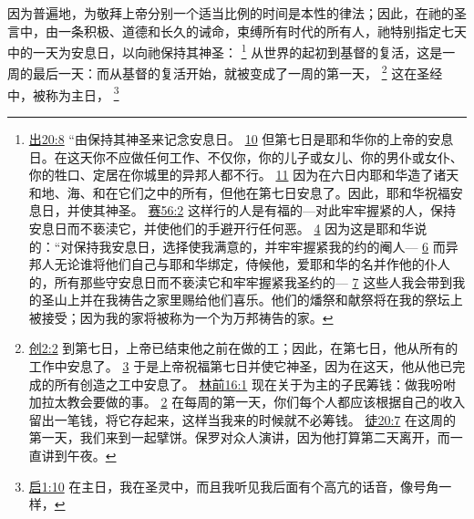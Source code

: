 \documentclass[12pt, a4paper, oneside]{ctexart}
\newcounter{parnum}[section]
\newcommand{\N}{%
   \noindent\refstepcounter{parnum}%
    \makebox[\parindent][l]{\textbf{\arabic{parnum}.}}}
\begin{document}
\N 因为普遍地，为敬拜上帝分别一个适当比例的时间是本性的律法；因此，在祂的圣言中，由一条积极、道德和长久的诫命，束缚所有时代的所有人，祂特别指定七天中的一天为安息日，以向祂保持其神圣：
	\footnote {
		\href{https://biblehub.com/exodus/20-8.htm}{出20:8} “由保持其神圣来记念安息日。
		\href{https://biblehub.com/exodus/20-10.htm}{10} 但第七日是耶和华你的上帝的安息日。在这天你不应做任何工作、不仅你，你的儿子或女儿、你的男仆或女仆、你的牲口、定居在你城里的异邦人都不行。
		\href{https://biblehub.com/exodus/20-11.htm}{11} 因为在六日内耶和华造了诸天和地、海、和在它们之中的所有，但他在第七日安息了。因此，耶和华祝福安息日，并使其神圣。
		\href{https://biblehub.com/isaiah/56-2.htm}{赛56:2} 这样行的人是有福的---对此牢牢握紧的人，保持安息日而不亵渎它，并使他们的手避开行任何恶。
		\href{https://biblehub.com/isaiah/56-4.htm}{4} 因为这是耶和华说的：“对保持我安息日，选择使我满意的，并牢牢握紧我的约的阉人---
		\href{https://biblehub.com/isaiah/56-6.htm}{6} 而异邦人无论谁将他们自己与耶和华绑定，侍候他，爱耶和华的名并作他的仆人的，所有那些守安息日而不亵渎它和牢牢握紧我圣约的---
		\href{https://biblehub.com/isaiah/56-7.htm}{7} 这些人我会带到我的圣山上并在我祷告之家里赐给他们喜乐。他们的燔祭和献祭将在我的祭坛上被接受；因为我的家将被称为一个为万邦祷告的家。
	}
	从世界的起初到基督的复活，这是一周的最后一天：而从基督的复活开始，就被变成了一周的第一天，
	\footnote {
		\href{https://biblehub.com/genesis/2-2.htm}{创2:2} 到第七日，上帝已结束他之前在做的工；因此，在第七日，他从所有的工作中安息了。
		\href{https://biblehub.com/genesis/2-3.htm}{3} 于是上帝祝福第七日并使它神圣，因为在这天，他从他已完成的所有创造之工中安息了。
		\href{https://biblehub.com/1_corinthians/16-1.htm}{林前16:1} 现在关于为主的子民筹钱：做我吩咐加拉太教会要做的事。
		\href{https://biblehub.com/1_corinthians/16-2.htm}{2} 在每周的第一天，你们每个人都应该根据自己的收入留出一笔钱，将它存起来，这样当我来的时候就不必筹钱。
		\href{https://biblehub.com/acts/20-7.htm}{徒20:7} 在这周的第一天，我们来到一起擘饼。保罗对众人演讲，因为他打算第二天离开，而一直讲到午夜。
	}
	这在圣经中，被称为主日，
	\footnote {
		\href{https://biblehub.com/revelation/1-10.htm}{启1:10} 在主日，我在圣灵中，而且我听见我后面有个高亢的话音，像号角一样，
	}
\end{document}
